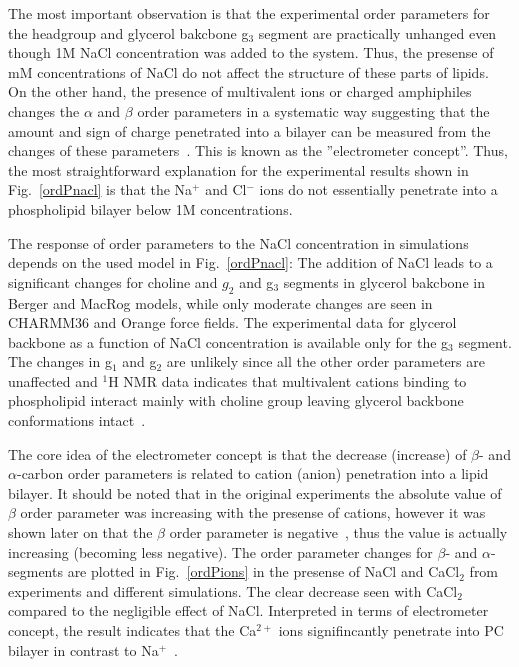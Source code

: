 \documentclass[pre,aps,floatfix,authordate1-4,twocolumn]{revtex4-1}
\begin{document}
The most important observation is that the experimental order parameters for the headgroup and glycerol bakcbone g$_3$ segment 
are practically unhanged even though 1M NaCl concentration was added to the system. Thus, the presense of mM concentrations
of NaCl do not affect the structure of these parts of lipids. On the other hand, the presence of multivalent ions or 
charged amphiphiles changes the $\alpha$ and $\beta$ order parameters in a systematic way suggesting that the amount
and sign of charge penetrated into a bilayer can be measured from the changes of these parameters~\cite{akutsu81,altenbach84,seelig87,scherer89}.
This is known as the ''electrometer concept''. Thus, the most straightforward explanation for the experimental results shown
in Fig.~\ref{ordPnacl} is that the Na$^+$ and Cl$^-$ ions do not essentially penetrate into a phospholipid bilayer below 1M concentrations.

The response of order parameters to the NaCl concentration in simulations depends on the used model in Fig.~\ref{ordPnacl}:
The addition of NaCl leads to a significant changes for choline and $g_2$ and g$_3$ segments in glycerol bakcbone
in Berger and MacRog models, while only moderate changes are seen in CHARMM36 and Orange force fields.
The experimental data for glycerol backbone as a function of NaCl concentration is available only for the
g$_3$ segment. The changes in g$_1$ and g$_2$ are unlikely since all the other order parameters are unaffected
and $^1$H NMR data indicates that multivalent cations binding to phospholipid interact mainly with choline group
leaving glycerol backbone conformations intact~\cite{hauser76,hauser78}.




The core idea of the electrometer concept is that the decrease (increase) of $\beta$- and $\alpha$-carbon order parameters
is related to cation (anion) penetration into a lipid bilayer. 
It should be noted that in the original experiments the absolute value of $\beta$ order parameter was increasing with the presense of cations,
however it was shown later on that the $\beta$ order parameter is negative~\cite{hong95a,hong95b,gross97}, 
thus the value is actually increasing (becoming less negative).
The order parameter changes for  $\beta$- and $\alpha$-segments 
are plotted in Fig.~\ref{ordPions} in the presense of NaCl and CaCl$_2$ from experiments and different simulations. 
The clear decrease seen with CaCl$_2$ compared to the negligible effect of NaCl. Interpreted in terms of
electrometer concept, the result indicates that the Ca$^{2+}$ ions signifincantly penetrate into PC bilayer in contrast to 
Na$^+$~\cite{akutsu81,altenbach84}.
\end{document}
